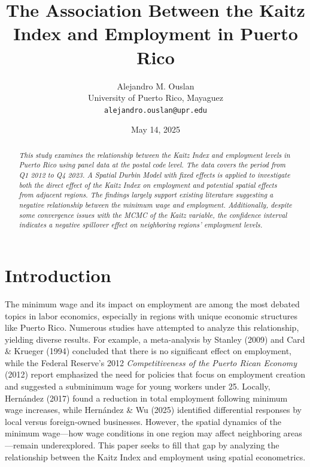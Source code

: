 \documentclass[12pt]{article}
\title{The Association Between the Kaitz Index and Employment in Puerto Rico}
\author{Alejandro M. Ouslan \\ \small{University of Puerto Rico, Mayaguez} \\ \small{\texttt{alejandro.ouslan@upr.edu}}}
\date{May 14, 2025}
\begin{document}
\maketitle

\singlespacing

\begin{abstract}
	\textit{
		This study examines the relationship between the Kaitz Index and employment levels in Puerto Rico using panel data at the
		postal code level. The data covers the period from Q1 2012 to Q4 2023. A Spatial Durbin Model with fixed effects is applied
		to investigate both the direct effect of the Kaitz Index on employment and potential spatial effects from adjacent regions.
		The findings largely support existing literature suggesting a negative relationship between the minimum wage and employment.
		Additionally, despite some convergence issues with the MCMC of the Kaitz variable, the confidence interval indicates a
		negative spillover effect on neighboring regions’ employment levels.
	}
\end{abstract}

\section{Introduction}

The minimum wage and its impact on employment are among the most debated topics in labor economics, especially in regions with
unique economic structures like Puerto Rico. Numerous studies have attempted to analyze this relationship, yielding diverse
results. For example, a meta-analysis by Stanley (2009) \cite{doucouliagos2009publication} and Card \& Krueger (1994) \cite{card1994comment} concluded that there is no significant
effect on employment, while the Federal Reserve's 2012 \textit{Competitiveness of the Puerto Rican Economy} (2012) \cite{torres2012competitividad} report emphasized
the need for policies that focus on employment creation and suggested a subminimum wage for young workers under 25. Locally,
Hernández (2017) found a reduction in total employment following minimum wage increases, while Hernández \& Wu (2025)
identified differential responses by local versus foreign-owned businesses. However, the spatial dynamics of the minimum
wage—how wage conditions in one region may affect neighboring areas—remain underexplored. This paper seeks to fill that gap
by analyzing the relationship between the Kaitz Index \cite{williams1998minimum} and employment using spatial econometrics.
\end{document}
